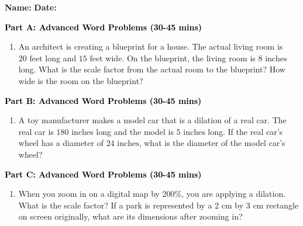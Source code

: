 \documentclass[12pt, letterpaper, fleqn]{article}
\begin{document}
\textbf{Name:} \underline{\hspace{5cm}}
\hfill
\textbf{Date:} \underline{\hspace{3cm}}\\


\begin{tcolorbox}[colback=customteal!20]
\large\textcolor{black}{\textbf{Part A: Advanced Word Problems (30-45 mins)}}
\end{tcolorbox}

\vspace{3mm}

\begin{enumerate}[itemsep=5.5cm, leftmargin=0.6cm]
\item An architect is creating a blueprint for a house. The actual living room is $20\text{ feet}$ long and $15\text{ feet}$ wide. On the blueprint, the living room is $8\text{ inches}$ long. What is the scale factor from the actual room to the blueprint? How wide is the room on the blueprint?
\end{enumerate}

\newpage

\begin{tcolorbox}[colback=customteal!20]
\large\textcolor{black}{\textbf{Part B: Advanced Word Problems (30-45 mins)}}
\end{tcolorbox}

\vspace{3mm}

\begin{enumerate}[itemsep=5.5cm, leftmargin=0.6cm, resume]
\item A toy manufacturer makes a model car that is a dilation of a real car. The real car is $180\text{ inches}$ long and the model is $5\text{ inches}$ long. If the real car's wheel has a diameter of $24\text{ inches}$, what is the diameter of the model car's wheel?
\end{enumerate}

\newpage

\begin{tcolorbox}[colback=customteal!20]
\large\textcolor{black}{\textbf{Part C: Advanced Word Problems (30-45 mins)}}
\end{tcolorbox}

\vspace{3mm}

\begin{enumerate}[itemsep=5.5cm, leftmargin=0.6cm, resume]
\item When you zoom in on a digital map by $200\%$, you are applying a dilation. What is the scale factor? If a park is represented by a $2\text{ cm}$ by $3\text{ cm}$ rectangle on screen originally, what are its dimensions after zooming in?
\end{enumerate}
\end{document}
